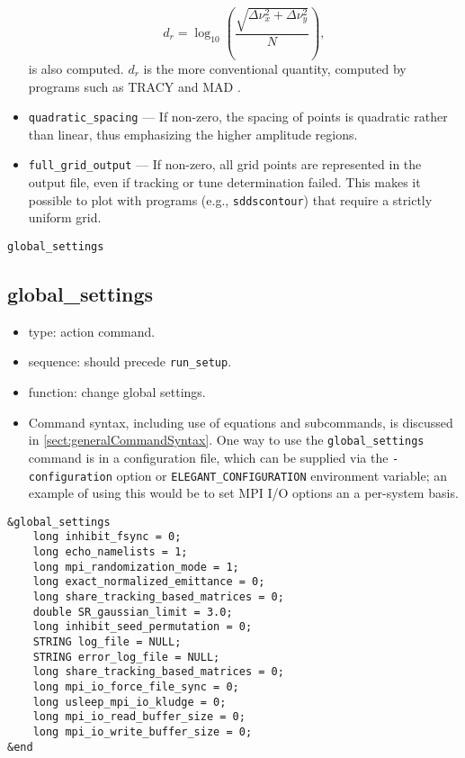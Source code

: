 \documentclass[11pt]{article}
\begin{document}
\begin{itemize}
\begin{equation}
  d_r = \log_{10} \left(\frac{\sqrt{\Delta\nu_x^2 + \Delta\nu_y^2}}{N}\right),
\end{equation} is also computed. $d_r$ is the more conventional quantity, computed by
programs such as TRACY and MAD \cite{BuesingPC}.
\item \verb|quadratic_spacing| --- If non-zero, the spacing of points is quadratic rather than linear, thus emphasizing
  the higher amplitude regions.
\item \verb|full_grid_output| --- If non-zero, all grid points are represented in the output file, even if tracking or
  tune determination failed. This makes it possible to plot with programs (e.g., \verb|sddscontour|) that require
  a strictly uniform grid.
\end{itemize}

\newpage
\begin{center}{\Large\verb|global_settings|}\end{center}
\subsection{global\_settings \label{subsec:globalsettings}}

\begin{itemize}
\item type: action command.  
\item sequence: should precede \verb|run_setup|.
\item function: change global settings.
\item Command syntax, including use of equations and subcommands, is discussed in \ref{sect:generalCommandSyntax}.
 One way to use the \verb|global_settings| command is in a configuration file, which can be supplied via the 
 \verb|-configuration| option or \verb|ELEGANT_CONFIGURATION| environment variable; an example of using this
 would be to set MPI I/O options an a per-system basis.
\end{itemize}

\begin{verbatim}
&global_settings
    long inhibit_fsync = 0;
    long echo_namelists = 1;
    long mpi_randomization_mode = 1;
    long exact_normalized_emittance = 0;
    long share_tracking_based_matrices = 0;
    double SR_gaussian_limit = 3.0;
    long inhibit_seed_permutation = 0;
    STRING log_file = NULL;
    STRING error_log_file = NULL;
    long share_tracking_based_matrices = 0;
    long mpi_io_force_file_sync = 0;
    long usleep_mpi_io_kludge = 0;
    long mpi_io_read_buffer_size = 0;
    long mpi_io_write_buffer_size = 0;
&end
\end{verbatim}
\end{document}
